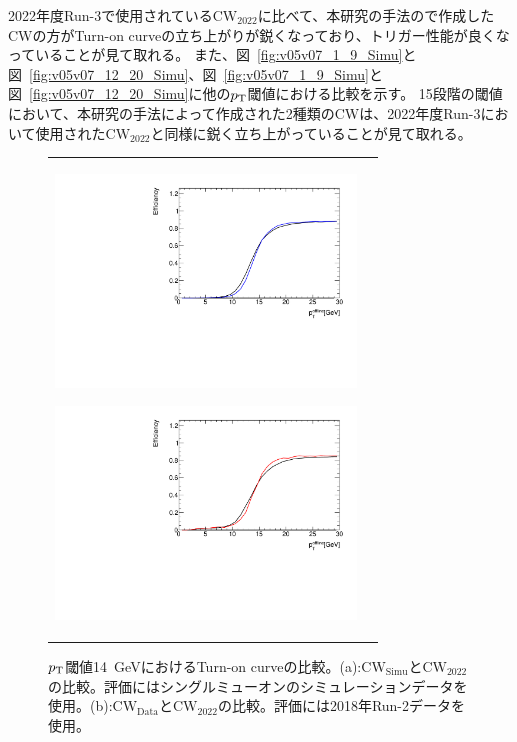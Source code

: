 2022年度Run-3で使用されている$\mathrm{CW_{2022}}$に比べて、本研究の手法ので作成したCWの方がTurn-on curveの立ち上がりが鋭くなっており、トリガー性能が良くなっていることが見て取れる。
また、図~\ref{fig:v05v07_1_9_Simu}と図~\ref{fig:v05v07_12_20_Simu}、図~\ref{fig:v05v07_1_9_Simu}と図~\ref{fig:v05v07_12_20_Simu}に他の$p_{\rm{T}}$閾値における比較を示す。
15段階の閾値において、本研究の手法によって作成された2種類のCWは、2022年度Run-3において使用された$\mathrm{CW_{2022}}$と同様に鋭く立ち上がっていることが見て取れる。
\begin{figure}
    \begin{tabular}{cc}
    \centering
    \begin{minipage}[b]{0.45\hsize}%
        \centering
        \hspace*{-1.5cm}
        \includegraphics[clip, width=8cm]{fig/5/v05vsv07_MU14.pdf}
        \subcaption{}
        \label{fig:v05v07}
    \end{minipage}%
    \begin{minipage}[b]{0.7\hsize}%
        \centering
        \hspace*{-0.75cm}
        \includegraphics[clip, width=8cm]{fig/5/v05vsv06_MU14.pdf}
        \subcaption{}
        \label{fig:v05v06}
    \end{minipage}%
    \end{tabular}
    \caption{$p_{\rm{T}}$閾値14~GeVにおけるTurn-on curveの比較。(a):$\mathrm{CW_{Simu}}$と$\mathrm{CW_{2022}}$の比較。評価にはシングルミューオンのシミュレーションデータを使用。(b):$\mathrm{CW_{Data}}$と$\mathrm{CW_{2022}}$の比較。評価には2018年Run-2データを使用。}
    \label{fig:v05v07v06}
\end{figure}


